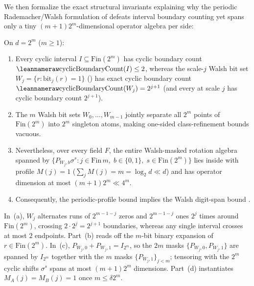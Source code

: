 We then formalize the exact structural invariants explaining why the periodic Rademacher/Walsh
formulation of \cite[Problem~9.3]{SeventeenthPaper2026} defeats interval boundary counting yet spans
only a tiny $(m+1)2^m$-dimensional operator algebra per side:

\begin{theorem}\label{thm:walsh-dichotomy}
On $d = 2^m$ ($m \ge 1$):
\begin{enumerate}[label=(\alph*)]
\item Every cyclic interval $I \subseteq \mathrm{Fin}(2^m)$ has cyclic boundary count
  $\lean{cyclicBoundaryCount}(I) \le 2$, whereas the scale-$j$ Walsh bit set
  $W_j = \{r : \text{bit}_j(r) = 1\}$ () has exact cyclic boundary count
  $\lean{cyclicBoundaryCount}(W_j) = 2^{j+1}$ (and every  at scale
  $j$ has cyclic boundary count $2^{j+1}$).
\item The $m$ Walsh bit sets $W_0, \dots, W_{m-1}$ jointly separate all $2^m$ points of
  $\mathrm{Fin}(2^m)$ into $2^m$ singleton atoms, making one-sided class-refinement bounds vacuous.
\item Nevertheless, over every field $F$, the entire Walsh-masked rotation algebra spanned by
  $\{P_{W_j, b}\sigma^s : j \in \mathrm{Fin}\,m,\; b \in \{0,1\},\; s \in \mathrm{Fin}(2^m)\}$ lies
  inside  with profile $M(j) = 1$ ($\sum_j M(j) = m =
  \log_2 d \ll d$) and has operator dimension at most $(m + 1)2^m \ll 4^m$.
\item Consequently, the periodic-profile bound 
  implies the Walsh digit-span bound .
\end{enumerate}
\end{theorem}
\begin{outline}
In~(a), $W_j$ alternates runs of $2^{m-1-j}$ zeros and $2^{m-1-j}$ ones $2^j$ times around
$\mathrm{Fin}(2^m)$, crossing $2 \cdot 2^j = 2^{j+1}$ boundaries, whereas any single interval
crosses at most $2$ endpoints. Part~(b) reads off the $m$-bit binary expansion of $r \in
\mathrm{Fin}(2^m)$. In~(c), $P_{W_j, 0} + P_{W_j, 1} = I_{2^m}$, so the $2m$ masks $\{P_{W_j,0},
P_{W_j,1}\}$ are spanned by $I_{2^m}$ together with the $m$ masks $\{P_{W_j,1}\}_{j < m}$; tensoring
with the $2^m$ cyclic shifts $\sigma^s$ spans at most $(m+1)2^m$ dimensions. Part~(d) instantiates
$M_A(j) = M_B(j) = 1$ once $m \le \delta 2^m$.
\end{outline}

